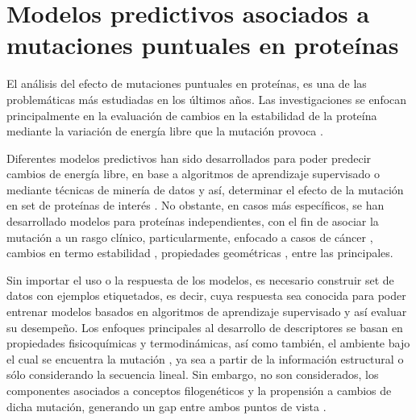 
\chapter{Modelos predictivos asociados a mutaciones puntuales en proteínas \label{cap2}}

\ifpdf
    \graphicspath{{Chapter2/Figs/Raster/}{Chapter2/Figs/PDF/}{Chapter2/Figs/}}
\else
    \graphicspath{{Chapter2/Figs/Vector/}{Chapter2/Figs/}}
\fi

El análisis del efecto de mutaciones puntuales en proteínas, es una de las problemáticas más estudiadas en los últimos años. Las investigaciones se enfocan principalmente en la evaluación de cambios en la estabilidad de la proteína mediante la variación de energía libre que la mutación provoca \cite{Schymkowitz2005,Pandurangan2017,rohl2004protein,Parthiban2006}. 

Diferentes modelos predictivos han sido desarrollados para poder predecir cambios de energía libre, en base a algoritmos de aprendizaje supervisado o mediante técnicas de minería de datos y así, determinar el efecto de la mutación en set de proteínas de interés \cite{Quan2016,Capriotti2008,Broom2017,Khan2010,vaisman,Getov2016,Capriotti2005}. No obstante, en casos más específicos, se han desarrollado modelos para proteínas independientes, con el fin de asociar la mutación a un rasgo clínico, particularmente, enfocado a casos de cáncer \cite{article, Forbes2010}, cambios en termo estabilidad \cite{Tian2010}, propiedades geométricas \cite{Barenboim2008}, entre las principales.

Sin importar el uso o la respuesta de los modelos, es necesario construir set de datos con ejemplos etiquetados, es decir, cuya respuesta sea conocida para poder entrenar modelos basados en algoritmos de aprendizaje supervisado y así evaluar su desempeño. Los enfoques principales al desarrollo de descriptores se basan en propiedades fisicoquímicas y termodinámicas, así como también, el ambiente bajo el cual se encuentra la mutación \cite{Capriotti2005}, ya sea a partir de la información estructural o sólo considerando la secuencia lineal. Sin embargo, no son considerados, los componentes asociados a conceptos filogenéticos y la propensión a cambios de dicha mutación, generando un gap entre ambos puntos de vista \cite{Olivera-Nappa2011}.

